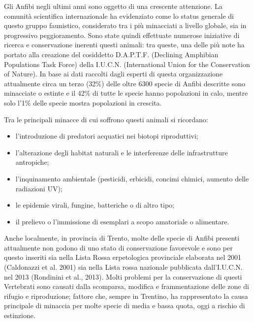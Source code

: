 \documentclass[11pt,a4paper,twoside]{memoir}
\begin{document}
Gli Anfibi negli ultimi anni sono oggetto di una crescente attenzione. La comunità scientifica internazionale ha evidenziato come lo status generale di questo gruppo faunistico, considerato tra i più minacciati a livello globale, sia in progressivo peggioramento. Sono state quindi effettuate numerose iniziative di ricerca e conservazione inerenti questi animali: tra queste, una delle più note ha portato alla creazione del cosiddetto D.A.P.T.F. (Declining Amphibian Populations Task Force) della I.U.C.N. (International Union for the Conservation of Nature). In base ai dati raccolti dagli esperti di questa organizzazione attualmente circa un terzo (32\%) delle oltre 6300 specie di Anfibi descritte sono minacciate o estinte e il 42\% di tutte le specie hanno popolazioni in calo, mentre solo l'1\% delle specie mostra popolazioni in crescita.

Tra le principali minacce di cui soffrono questi animali si ricordano: 
\begin{itemize}\itemsep0pt
  \item l'introduzione di predatori acquatici nei biotopi riproduttivi; 
  \item l'alterazione degli habitat naturali e le interferenze delle infrastrutture antropiche; 
  \item l'inquinamento ambientale (pesticidi, erbicidi, concimi chimici, aumento delle radiazioni UV); 
  \item le epidemie virali, fungine, batteriche o di altro tipo; 
  \item il prelievo o l'immissione di esemplari a scopo amatoriale o alimentare.
\end{itemize}

Anche localmente, in provincia di Trento, molte delle specie di Anfibi presenti attualmente non godono di uno stato di conservazione favorevole e sono per questo inseriti sia nella Lista Rossa erpetologica provinciale elaborata nel 2001 (Caldonazzi et al. 2001) sia nella Lista rossa nazionale pubblicata dall'I.U.C.N. nel 2013 (Rondinini et al., 2013). 
Molti problemi per la conservazione di questi Vertebrati sono causati dalla scomparsa, modifica e frammentazione delle zone di rifugio e riproduzione; fattore che, sempre in Trentino, ha rappresentato la causa principale di minaccia per molte specie di media e bassa quota, oggi a rischio di estinzione. 
\end{document}
